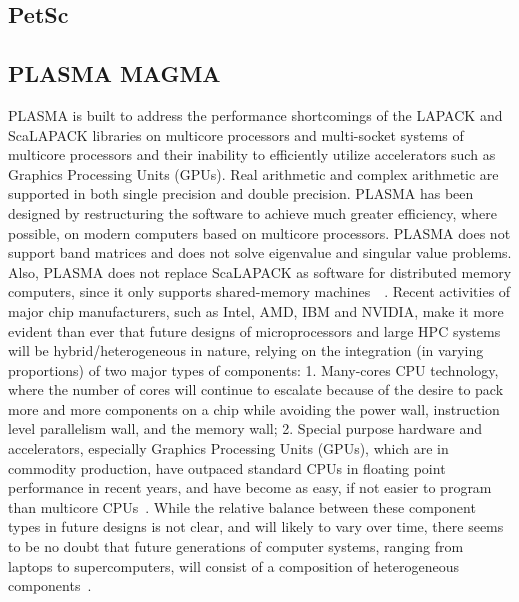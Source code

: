 \subsection{PetSc}

\pv

\subsection{PLASMA MAGMA}

PLASMA is built to address the performance shortcomings of the LAPACK
and ScaLAPACK libraries on multicore processors and multi-socket
systems of multicore processors and their inability to efficiently
utilize accelerators such as Graphics Processing Units (GPUs). Real
arithmetic and complex arithmetic are supported in both single
precision and double precision.  PLASMA has been designed by
restructuring the software to achieve much greater efficiency, where
possible, on modern computers based on multicore processors. PLASMA
does not support band matrices and does not solve eigenvalue and
singular value problems. Also, PLASMA does not replace ScaLAPACK as
software for distributed memory computers, since it only supports
shared-memory
machines~\cite{paper-plasma-magma-1}~\cite{www-plasma-1}. Recent
activities of major chip manufacturers, such as Intel, AMD, IBM and
NVIDIA, make it more evident than ever that future designs of
microprocessors and large HPC systems will be hybrid/heterogeneous in
nature, relying on the integration (in varying proportions) of two
major types of components: 1. Many-cores CPU technology, where the
number of cores will continue to escalate because of the desire to
pack more and more components on a chip while avoiding the power wall,
instruction level parallelism wall, and the memory wall; 2. Special
purpose hardware and accelerators, especially Graphics Processing
Units (GPUs), which are in commodity production, have outpaced
standard CPUs in floating point performance in recent years, and have
become as easy, if not easier to program than multicore
CPUs~\cite{paper-plasma-magma-2, paper-plasma-magma-3}.  While the
relative balance between these component types in future designs is
not clear, and will likely to vary over time, there seems to be no
doubt that future generations of computer systems, ranging from
laptops to supercomputers, will consist of a composition of
heterogeneous
components~\cite{paper-plasma-magma-4,paper-plasma-magma-5,paper-plasma-magma-6}.


\pv

